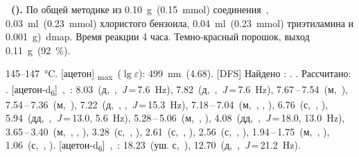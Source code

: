 \textbf{~().} 
По общей методике из \SI{0.10}{\gram}~(\SI{0.15}{\milli\mole}) соединения~, \SI{0.03}{\milli\litre}~(\SI{0.23}{\milli\mole}) хлористого бензоила, \SI{0.04}{\milli\litre}~(\SI{0.23}{\milli\mole}) триэтиламина и \SI{0.001}{\gram})~\ac{dmap}.
Время реакции 4 часа.
Темно-красный порошок, выход \SI{0.11}{\gram}~(\SI{92}{\percent}).
\begin{experimental}
     145--\SI{147}{\celsius}.
    [ацетон] \chemlambda\textsubscript{max}~($\lg \varepsilon$): \SI{499}{\nano\metre}~(4.68).
    [DFS] Найдено \ce{[M+]}: \num{}. . Рассчитано:  \num{}. 
    [ацетон-d\textsubscript{6}]~\chemdelta,~\si{\ppm}: 8.03~(д,~,~\textit{J}\,=\,7.6~\si{\hertz}), 7.82~(д,~,~\textit{J}\,=\,7.6~\si{\hertz}), 7.67\,--\,7.54~(м,~), 7.54\,--\,7.36~(м,~), 7.22~(д,~, ,~\textit{J}\,=\,15.3~\si{\hertz}), 7.18\,--\,7.04~(м,~, , ), 6.76~(с,~, ), 5.94~(дд,~,~\textit{J}\,=\,13.0, 5.6~\si{\hertz}), 5.28\,--\,5.06~(м,~, ), 4.08~(дд,~,~\textit{J}\,=\,18.0, 13.0~\si{\hertz}), 3.65\,--\,3.40~(м,~, , ), 3.28~(с,~, ), 2.61~(с,~, ), 2.56~(с,~, ), 1.94\,--\,1.75~(м,~, ), 1.06~(с,~, ).
    [ацетон-d\textsubscript{6}]~\chemdelta,~\si{\ppm}: 18.23~(уш. с,~), 12.70~(д,~,~\textit{J}\,=\,21.2~\si{\hertz}).
\end{experimental}

